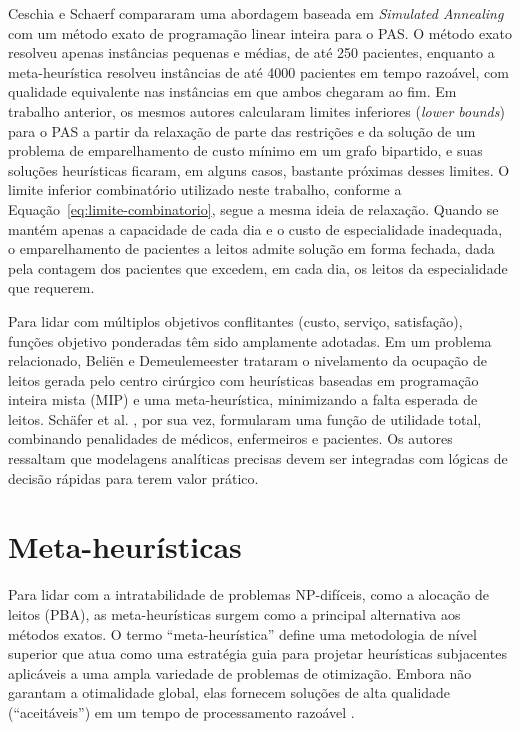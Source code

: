 Ceschia e Schaerf \cite{ceschia2012modeling} compararam uma abordagem baseada em \textit{Simulated Annealing} com um método exato de programação linear inteira para o PAS. O método exato resolveu apenas instâncias pequenas e médias, de até 250 pacientes, enquanto a meta-heurística resolveu instâncias de até 4000 pacientes em tempo razoável, com qualidade equivalente nas instâncias em que ambos chegaram ao fim. Em trabalho anterior, os mesmos autores \cite{ceschia2011local} calcularam limites inferiores (\textit{lower bounds}) para o PAS a partir da relaxação de parte das restrições e da solução de um problema de emparelhamento de custo mínimo em um grafo bipartido, e suas soluções heurísticas ficaram, em alguns casos, bastante próximas desses limites. O limite inferior combinatório utilizado neste trabalho, conforme a Equação~\eqref{eq:limite-combinatorio}, segue a mesma ideia de relaxação. Quando se mantém apenas a capacidade de cada dia e o custo de especialidade inadequada, o emparelhamento de pacientes a leitos admite solução em forma fechada, dada pela contagem dos pacientes que excedem, em cada dia, os leitos da especialidade que requerem.

Para lidar com múltiplos objetivos conflitantes (custo, serviço, satisfação), funções objetivo ponderadas têm sido amplamente adotadas. Em um problema relacionado, Beliën e Demeulemeester \cite{belien2007building} trataram o nivelamento da ocupação de leitos gerada pelo centro cirúrgico com heurísticas baseadas em programação inteira mista (MIP) e uma meta-heurística, minimizando a falta esperada de leitos. Schäfer et al. \cite{schafer2023combining}, por sua vez, formularam uma função de utilidade total, combinando penalidades de médicos, enfermeiros e pacientes. Os autores ressaltam que modelagens analíticas precisas devem ser integradas com lógicas de decisão rápidas para terem valor prático.


\section{Meta-heurísticas}

Para lidar com a intratabilidade de problemas NP-difíceis, como a alocação de leitos (PBA), as meta-heurísticas surgem como a principal alternativa aos métodos exatos. O termo ``meta-heurística'' define uma metodologia de nível superior que atua como uma estratégia guia para projetar heurísticas subjacentes aplicáveis a uma ampla variedade de problemas de otimização. Embora não garantam a otimalidade global, elas fornecem soluções de alta qualidade (``aceitáveis'') em um tempo de processamento razoável \cite{talbi2009metaheuristics}.

